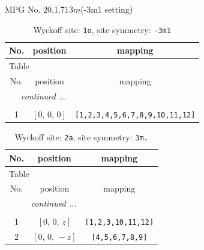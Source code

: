 \documentclass[fleqn,8pt]{jsarticle}
\begin{document}
\setcounter{MaxMatrixCols}{32}

\renewcommand{\tablename}{Table~}
\renewcommand{\figurename}{Figure~}
\begin{center}
\LARGE
MPG No. 20.1.71\quad$\bar{3}m$\quad(-3m1 setting)
\end{center}
\renewcommand{\arraystretch}{1.2}
\begin{longtable}{ccc}
\caption{Wyckoff site: {\tt 1o}, site symmetry: {\tt -3m1}}
 \\
 \hline \hline
No. & position & mapping \\ \hline \endfirsthead

\multicolumn{2}{l}{\tablename\ \thetable{}} \\
 \hline \hline
No. & position & mapping \\ \hline \endhead

 \hline \hline
\multicolumn{2}{r}{\footnotesize\it continued ...} \\ \endfoot

 \hline \hline
\multicolumn{2}{r}{} \\ \endlastfoot

1 & $\left[ 0,\, 0,\, 0 \right]$ & {\tt [1,2,3,4,5,6,7,8,9,10,11,12]} \\
\end{longtable}
\renewcommand{\arraystretch}{1.2}
\begin{longtable}{ccc}
\caption{Wyckoff site: {\tt 2a}, site symmetry: {\tt 3m.}}
 \\
 \hline \hline
No. & position & mapping \\ \hline \endfirsthead

\multicolumn{2}{l}{\tablename\ \thetable{}} \\
 \hline \hline
No. & position & mapping \\ \hline \endhead

 \hline \hline
\multicolumn{2}{r}{\footnotesize\it continued ...} \\ \endfoot

 \hline \hline
\multicolumn{2}{r}{} \\ \endlastfoot

1 & $\left[ 0,\, 0,\, z \right]$ & {\tt [1,2,3,10,11,12]} \\ \hline
2 & $\left[ 0,\, 0,\, - z \right]$ & {\tt [4,5,6,7,8,9]} \\
\end{longtable}
\renewcommand{\arraystretch}{1.2}
\end{document}
